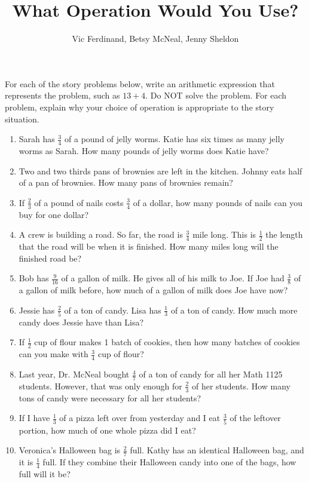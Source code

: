 \documentclass[nooutcomes,noauthor,handout]{ximera}
\title{What Operation Would You Use?}
\author{Vic Ferdinand, Betsy McNeal, Jenny Sheldon}
\begin{document}
\begin{abstract} \end{abstract}
\maketitle


\begin{problem}
For each of the story problems below, write an arithmetic expression that represents the problem, such as $13+4$.  Do NOT solve the problem.  For each problem, explain why your choice of operation is appropriate to the story situation.

\vskip 0.1in

\begin{enumerate}\itemsep0.7in

	\item Sarah has $\frac34$ of a pound of jelly worms.  Katie has six times as many jelly worms as Sarah.  How many pounds of jelly worms does Katie have?
	
	\item Two and two thirds pans of brownies are left in the kitchen.  Johnny eats half of a pan of brownies.  How many pans of brownies remain?

	\item  If $\frac23$ of a pound of nails costs $\frac34$ of a dollar,  how many pounds of nails can you buy for one dollar?

	\item  A crew is building a road.  So far, the road is $\frac34$ mile long.  This is $\frac12$ the length that the road will be when it is finished.  How many miles long will the finished road be?

	\item  Bob has $\frac{9}{16}$ of a gallon of milk.  He gives all of his milk to Joe.  If Joe had $\frac38$ of a gallon of milk before, how much of a gallon of milk does Joe have now?
	
	\item Jessie has $\frac25$ of a ton of candy.  Lisa has $\frac13$ of a ton of candy.  How much more candy does Jessie have than Lisa?

	\item If $\frac12$ cup of flour makes 1 batch of cookies, then how many batches of cookies can you make with $\frac34$ cup of flour?
	
	\item Last year, Dr. McNeal bought $\frac47$ of a ton of candy for all her Math 1125 students.  However, that was only enough for $\frac23$ of her students.  How many tons of candy were necessary for all her students?

	\item  If I have $\frac13$ of a pizza left over from yesterday and I eat $\frac35$ of the leftover portion, how much of one whole pizza did I eat?
		
	\item Veronica's Halloween bag is $\frac27$ full.  Kathy has an identical Halloween bag, and it is $\frac14$ full.  If they combine their Halloween candy into one of the bags, how full will it be?

\end{enumerate}
\end{problem}
\end{document}
